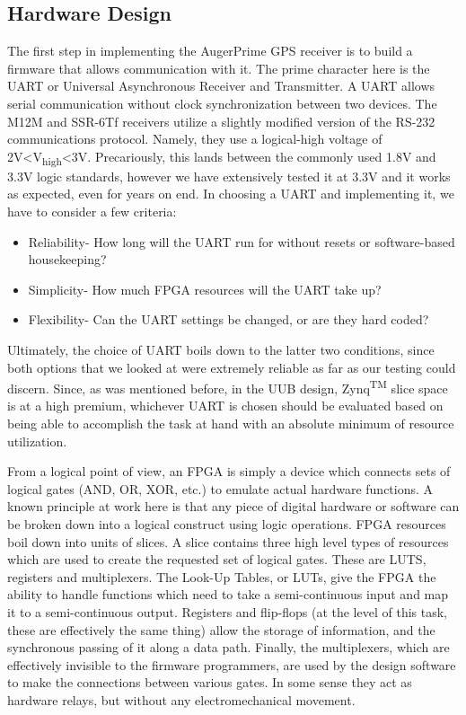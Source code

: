 \subsection{Hardware Design}
The first step in implementing the AugerPrime GPS receiver is to build a firmware that allows communication with it. The prime character here is the UART or Universal Asynchronous Receiver and Transmitter. A UART allows serial communication without clock synchronization between two devices. The M12M and SSR-6Tf receivers utilize a slightly modified version of the RS-232 communications protocol. Namely, they use a logical-high voltage of 2V\textless V\textsubscript{high}\textless 3V. Precariously, this lands between the commonly used 1.8V and 3.3V logic standards, however we have extensively tested it at 3.3V and it works as expected, even for years on end. In choosing a UART and implementing it, we have to consider a few criteria:
\begin{itemize}
\item Reliability- How long will the UART run for without resets or software-based housekeeping?
\item Simplicity- How much FPGA resources will the UART take up?
\item Flexibility- Can the UART settings be changed, or are they hard coded?
\end{itemize}
Ultimately, the choice of UART boils down to the latter two conditions, since both options that we looked at were extremely reliable as far as our testing could discern. Since, as was mentioned before, in the UUB design, Zynq\textsuperscript{TM} slice space is at a high premium, whichever UART is chosen should be evaluated based on being able to accomplish the task at hand with an absolute minimum of resource utilization. 

From a logical point of view, an FPGA is simply a device which connects sets of logical gates (AND, OR, XOR, etc.) to emulate actual hardware functions. A known principle at work here is that any piece of digital hardware or software can be broken down into a logical construct using logic operations. FPGA resources boil down into units of slices. A slice contains three high level types of resources which are used to create the requested set of logical gates. These are LUTS, registers and multiplexers. The Look-Up Tables, or LUTs, give the FPGA the ability to handle functions which need to take a semi-continuous input and map it to a semi-continuous output. Registers and flip-flops (at the level of this task, these are effectively the same thing) allow the storage of information, and the synchronous passing of it along a data path. Finally, the multiplexers, which are effectively invisible to the firmware programmers, are used by the design software to make the connections between various gates. In some sense they act as hardware relays, but without any electromechanical movement.

